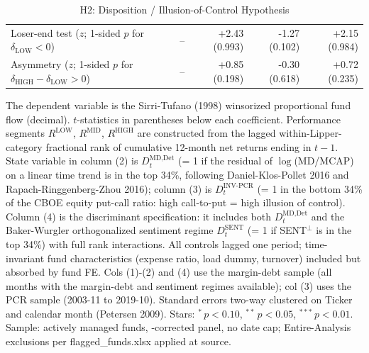 \begin{table}[!htbp]
{\begin{tabular*}{\linewidth}{@{\extracolsep{\fill}}lrrrr}
Loser-end test ($z$; 1-sided $p$ for $\delta_{\text{LOW}}<0$) & -- & +2.43 (0.993) & -1.27 (0.102) & +2.15 (0.984)\\
Asymmetry ($z$; 1-sided $p$ for $\delta_{\text{HIGH}}-\delta_{\text{LOW}}>0$) & -- & +0.85 (0.198) & -0.30 (0.618) & +0.72 (0.235)\\
\bottomrule
\end{tabular*}%
}\sbefit
\fi
\setlength{\tabletempwidth}{\wd\tabletempbox}
\ifdim\tabletempwidth>\linewidth\setlength{\tabletempwidth}{\linewidth}\fi
\begin{minipage}{\tabletempwidth}
\captionsetup{width=\linewidth}
\caption{H2: Disposition / Illusion-of-Control Hypothesis}\label{tab:H2_regression}
\ifdim\wd\tabletempbox>\linewidth
  \resizebox{\linewidth}{!}{\usebox{\tabletempbox}}
\else
  \usebox{\tabletempbox}
\fi
\par\medskip
\begin{singlespace}\tablefont\noindent
The dependent variable is the Sirri-Tufano (1998) winsorized proportional fund flow (decimal). $t$-statistics in parentheses below each coefficient. Performance segments $R^{\text{LOW}}$, $R^{\text{MID}}$, $R^{\text{HIGH}}$ are constructed from the lagged within-Lipper-category fractional rank of cumulative 12-month net returns ending in $t-1$. State variable in column (2) is $D^{\text{MD,Det}}_t$ (= 1 if the residual of $\log$(MD/MCAP) on a linear time trend is in the top 34\%, following Daniel-Klos-Pollet 2016 and Rapach-Ringgenberg-Zhou 2016); column (3) is $D^{\text{INV-PCR}}_t$ (= 1 in the bottom 34\% of the CBOE equity put-call ratio: high call-to-put = high illusion of control). Column (4) is the discriminant specification: it includes both $D^{\text{MD,Det}}_t$ and the Baker-Wurgler orthogonalized sentiment regime $D^{\text{SENT}}_t$ (= 1 if SENT$^\perp$ is in the top 34\%) with full rank interactions. All controls lagged one period; time-invariant fund characteristics (expense ratio, load dummy, turnover) included but absorbed by fund FE. Cols (1)-(2) and (4) use the margin-debt sample (all months with the margin-debt and sentiment regimes available); col (3) uses the PCR sample (2003-11 to 2019-10). Standard errors two-way clustered on Ticker and calendar month (Petersen 2009). Stars: $^{*}\,p<0.10$, $^{**}\,p<0.05$, $^{***}\,p<0.01$. Sample: actively managed funds, \textcite{Evans2010}-corrected panel, no date cap; Entire-Analysis exclusions per flagged\_funds.xlsx applied at source.
\end{singlespace}
\end{minipage}
\end{table}

